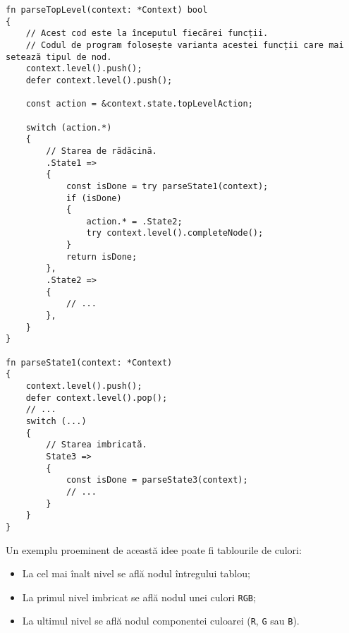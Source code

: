 \documentclass[a4paper,12pt]{report}
\begin{document}
\begin{verbatim}
fn parseTopLevel(context: *Context) bool
{
    // Acest cod este la începutul fiecărei funcții.
    // Codul de program folosește varianta acestei funcții care mai setează tipul de nod.
    context.level().push();
    defer context.level().push();

    const action = &context.state.topLevelAction;

    switch (action.*)
    {
        // Starea de rădăcină.
        .State1 =>
        {
            const isDone = try parseState1(context);
            if (isDone)
            {
                action.* = .State2;
                try context.level().completeNode();
            }
            return isDone;
        },
        .State2 =>
        {
            // ...
        },
    }
}

fn parseState1(context: *Context)
{
    context.level().push();
    defer context.level().pop();
    // ...
    switch (...)
    {
        // Starea imbricată.
        State3 =>
        {
            const isDone = parseState3(context);
            // ...
        }
    }
}
\end{verbatim}

Un exemplu proeminent de această idee poate fi tablourile de culori:
\begin{itemize}
    \item La cel mai înalt nivel se află nodul întregului tablou;
    \item La primul nivel imbricat se află nodul unei culori \texttt{\ac{RGB}};
    \item La ultimul nivel se află nodul componentei culoarei (\texttt{R}, \texttt{G} sau \texttt{B}).
\end{itemize}





\newpage
{}





\appendix

\renewcommand{\thechapter}{\arabic{chapter}}
\end{document}
